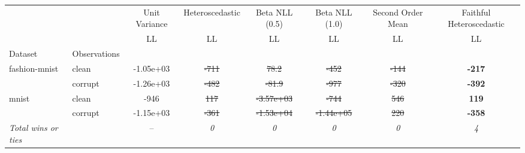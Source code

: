 \begin{tabular}{ll|c|c|c|c|c|c}
\toprule
{} & {} & {Unit Variance} & {Heteroscedastic} & {Beta NLL (0.5)} & {Beta NLL (1.0)} & {Second Order Mean} & {Faithful Heteroscedastic} \\
{} & {} & {LL} & {LL} & {LL} & {LL} & {LL} & {LL} \\
{Dataset} & {Observations} & {} & {} & {} & {} & {} & {} \\
\midrule
\multirow[t]{2}{*}{fashion-mnist} & clean & -1.05e+03 & \sout{-711} & \sout{78.2} & \sout{-452} & \sout{-144} & \textbf{-217} \\
 & corrupt & -1.26e+03 & \sout{-482} & \sout{-81.9} & \sout{-977} & \sout{-320} & \textbf{-392} \\
\multirow[t]{2}{*}{mnist} & clean & -946 & \sout{117} & \sout{-3.57e+03} & \sout{-744} & \sout{546} & \textbf{119} \\
 & corrupt & -1.15e+03 & \sout{-361} & \sout{-1.53e+04} & \sout{-1.44e+05} & \sout{220} & \textbf{-358} \\
\textit{{Total wins or ties}} &  & -- & \textit{0} & \textit{0} & \textit{0} & \textit{0} & \textit{4} \\
\bottomrule
\end{tabular}
